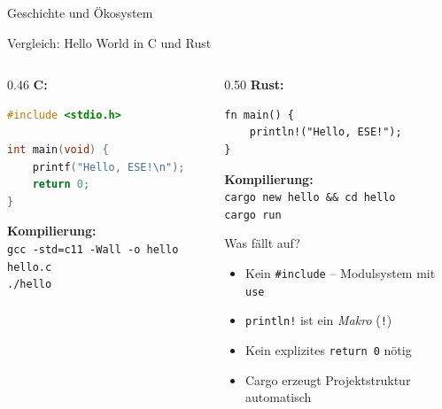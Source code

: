 \documentclass[%
  aspectratio=169,
  10pt
]{beamer}
\begin{document}
\begin{frame}{Geschichte und Ökosystem}
  \vspace{0.2em}
\end{frame}

\begin{frame}[fragile]{Vergleich: Hello World in C und Rust}
  \begin{columns}[T]
    \begin{column}{0.46\textwidth}
      \textbf{C:}
\begin{lstlisting}[language=C,morekeywords={printf}]
#include <stdio.h>

int main(void) {
    printf("Hello, ESE!\n");
    return 0;
}
\end{lstlisting}
      \textbf{Kompilierung:}\\
      {\small\texttt{gcc -std=c11 -Wall -o hello hello.c}\\
      \texttt{./hello}}
    \end{column}
    \begin{column}{0.50\textwidth}
      \textbf{Rust:}
\begin{lstlisting}
fn main() {
    println!("Hello, ESE!");
}
\end{lstlisting}
      \textbf{Kompilierung:}\\
      {\small\texttt{cargo new hello \&\& cd hello}\\
      \texttt{cargo run}}
      \vspace{0.3em}
      \begin{block}{Was fällt auf?}
        \small
        \begin{itemize}
          \item Kein \texttt{\#include} -- Modulsystem mit \texttt{use}
          \item \texttt{println!} ist ein \emph{Makro} (\texttt{!})
          \item Kein explizites \texttt{return 0} nötig
          \item Cargo erzeugt Projektstruktur automatisch
        \end{itemize}
      \end{block}
    \end{column}
  \end{columns}
\end{frame}
\end{document}
